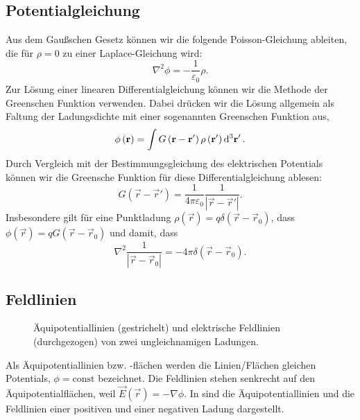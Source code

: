 \subsection{Potentialgleichung}

Aus dem Gaußschen Gesetz können wir die folgende Poisson-Gleichung ableiten, die für $\rho =0$ zu einer Laplace-Gleichung wird:
\begin{equation}
	\label{3.8}
	\boxed{\nabla ^{2}\phi =-\frac{1}{\varepsilon _{0}}\rho .}
\end{equation}
Zur Lösung einer linearen Differentialgleichung können wir die Methode der Greenschen Funktion verwenden. Dabei drücken wir die Lösung allgemein als Faltung der Ladungsdichte mit einer sogenannten Greenschen Funktion aus,
\begin{equation}
	\label{3.9}
	\phi \left(\vec {r}\right)=\int G\left(\vec {r}-\vec {r}'\right)\rho \left(\vec {r}'\right)\diffa[3]{\vec{r}'}.
\end{equation}
Durch Vergleich mit der Bestimmungsgleichung des elektrischen Potentials können wir die Greensche Funktion für diese Differentialgleichung ablesen:
\begin{equation}
	\label{3.10}
	G\left(\vec {r}-\vec {r}'\right)=\frac{1}{4\pi \varepsilon _{0}}\frac{1}{\left| \vec {r}-\vec {r}'\right| }.
\end{equation}
Insbesondere gilt für eine Punktladung $\rho \left(\vec {r}\right)=q\delta \left(\vec {r}-\vec {r}_{0}\right)$, dass $\phi \left(\vec {r}\right)=qG\left(\vec {r}-\vec {r}_{0}\right)$ und damit, dass
\begin{equation*}
	\nabla ^{2}\frac{1}{\left| \vec {r}-\vec {r}_{0}\right| }=-4\pi \delta \left(\vec {r}-\vec {r}_{0}\right).
\end{equation*}



\subsection{Feldlinien}

\begin{figure}[htb]
	\centering
	\tFigBoundaryConditionsDielectrica
	\caption{Äquipotentiallinien (gestrichelt) und elektrische Feldlinien (durchgezogen) von zwei ungleichnamigen Ladungen. }
	\label{fig:dipole_field_potential}
\end{figure}

Als Äquipotentiallinien bzw. -flächen werden die Linien/Flächen gleichen Potentials, $\phi =\text{const}$ bezeichnet. Die Feldlinien stehen senkrecht auf den Äquipotentialflächen, weil $\vec {E}\left(\vec {r}\right)=-\nabla \phi $. In  sind die Äquipotentiallinien und die Feldlinien einer positiven und einer negativen Ladung dargestellt.



